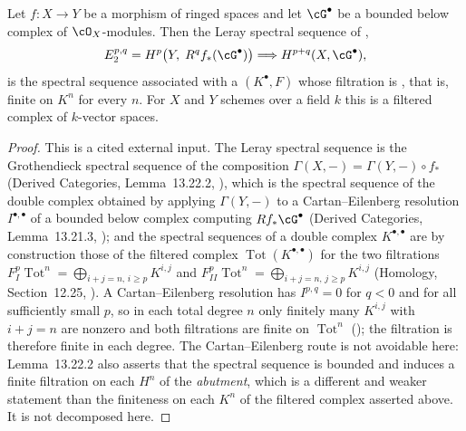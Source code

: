 \begin{lemma}
\label{lem:pc-leray-finite-filtration}
Let $f:X\to Y$ be a morphism of ringed spaces and let $\cG^\bullet$ be a
bounded below complex of $\cO_X$-modules.  Then the Leray spectral sequence
of ,
\[
E_2^{p,q}=H^p\bigl(Y,\;R^qf_*(\cG^\bullet)\bigr)
\Longrightarrow H^{p+q}(X,\cG^\bullet),
\]
is the spectral sequence associated with a
 $(K^\bullet,F)$ whose
filtration is ,
that is, finite on $K^n$ for every $n$.  For $X$ and $Y$ schemes over a
field $k$ this is a filtered complex of $k$-vector spaces.
\end{lemma}
\begin{proof}
This is a cited external input.  The Leray spectral sequence is the
Grothendieck spectral sequence of the composition
$\Gamma(X,-)=\Gamma(Y,-)\circ f_*$ (Derived Categories,
Lemma~13.22.2, ), which
is the spectral sequence of the double complex obtained by applying
$\Gamma(Y,-)$ to a Cartan--Eilenberg resolution $I^{\bullet,\bullet}$ of a
bounded below complex computing $Rf_*\cG^\bullet$ (Derived Categories,
Lemma~13.21.3, ); and
the spectral sequences of a double complex $K^{\bullet,\bullet}$ are by
construction those of the filtered complex
$\operatorname{Tot}(K^{\bullet,\bullet})$ for the two filtrations
$F_{I}^p\operatorname{Tot}^n=\bigoplus_{i+j=n,\,i\ge p}K^{i,j}$ and
$F_{II}^p\operatorname{Tot}^n=\bigoplus_{i+j=n,\,j\ge p}K^{i,j}$
(Homology, Section~12.25,
).  A
Cartan--Eilenberg resolution has $I^{p,q}=0$ for $q<0$ and for all
sufficiently small $p$, so in each total degree $n$ only finitely many
$K^{i,j}$ with $i+j=n$ are nonzero and both filtrations are finite on
$\operatorname{Tot}^n$ (); the filtration is
therefore finite in each degree.  The Cartan--Eilenberg route is not
avoidable here: Lemma~13.22.2 also asserts that the spectral sequence is
bounded and induces a finite filtration on each $H^n$ of the
\emph{abutment}, which is a different and weaker statement than the
finiteness on each $K^n$ of the filtered complex asserted above.  It is not
decomposed here.
\end{proof}

